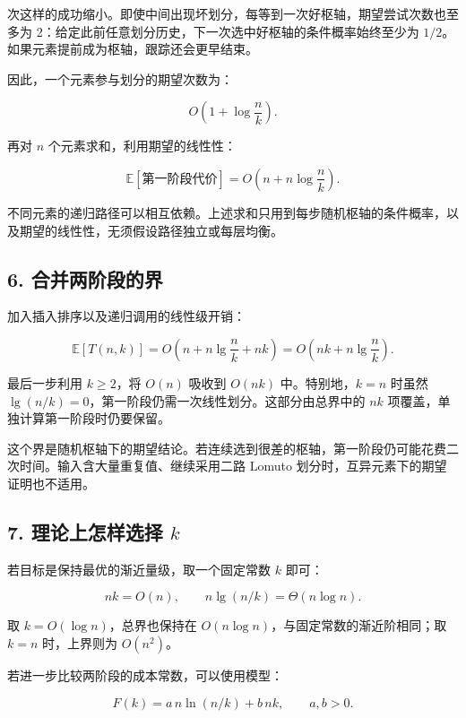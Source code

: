 \documentclass[
  UTF8,fontset=none,zihao=5]{ctexart}
\let\OldSubsection\subsection
\renewcommand{\subsection}{\Needspace{4\baselineskip}\OldSubsection}
\begin{document}
次这样的成功缩小。即使中间出现坏划分，每等到一次好枢轴，期望尝试次数也至多为
2：给定此前任意划分历史，下一次选中好枢轴的条件概率始终至少为
\(1/2\)。如果元素提前成为枢轴，跟踪还会更早结束。

因此，一个元素参与划分的期望次数为：

\[
O\left(1+\log\frac nk\right).
\]

再对 \(n\) 个元素求和，利用期望的线性性：

\[
\mathbb E[\text{第一阶段代价}]
=O\left(n+n\log\frac nk\right).
\]

不同元素的递归路径可以相互依赖。上述求和只用到每步随机枢轴的条件概率，以及期望的线性性，无须假设路径独立或每层均衡。

\hypertarget{ux5408ux5e76ux4e24ux9636ux6bb5ux7684ux754c}{%
\subsection{6.
合并两阶段的界}\label{ux5408ux5e76ux4e24ux9636ux6bb5ux7684ux754c}}

加入插入排序以及递归调用的线性级开销：

\[
\mathbb E[T(n,k)]
=O\left(n+n\lg\frac nk+nk\right)
=\boxed{O\left(nk+n\lg\frac nk\right)}.
\]

最后一步利用 \(k\ge2\)，将 \(O(n)\) 吸收到 \(O(nk)\) 中。特别地，\(k=n\)
时虽然 \(\lg(n/k)=0\)，第一阶段仍需一次线性划分。这部分由总界中的 \(nk\)
项覆盖，单独计算第一阶段时仍要保留。

这个界是随机枢轴下的期望结论。若连续选到很差的枢轴，第一阶段仍可能花费二次时间。输入含大量重复值、继续采用二路
Lomuto 划分时，互异元素下的期望证明也不适用。

\hypertarget{ux7406ux8bbaux4e0aux600eux6837ux9009ux62e9-k}{%
\subsection{\texorpdfstring{7. 理论上怎样选择
\(k\)}{7. 理论上怎样选择 k}}\label{ux7406ux8bbaux4e0aux600eux6837ux9009ux62e9-k}}

若目标是保持最优的渐近量级，取一个固定常数 \(k\) 即可：

\[
nk=O(n),\qquad n\lg(n/k)=\Theta(n\log n).
\]

取 \(k=O(\log n)\)，总界也保持在
\(O(n\log n)\)，与固定常数的渐近阶相同；取 \(k=n\) 时，上界则为
\(O(n^2)\)。

若进一步比较两阶段的成本常数，可以使用模型：

\[
F(k)=a\,n\ln(n/k)+b\,nk,\qquad a,b>0.
\]
\end{document}
